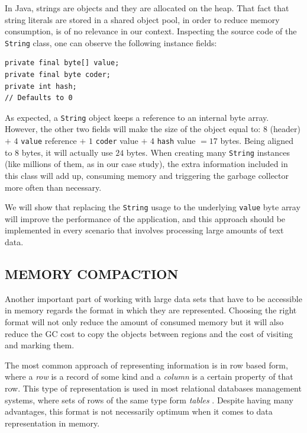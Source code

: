 \documentclass[a4paper,twoside]{article}
\begin{document}
In Java, strings are objects and they are allocated on the heap.
That fact that string literals are stored in a shared object pool, in order to reduce memory consumption, is of no relevance in our context.
Inspecting the source code of the \texttt{String} class, one can observe the following instance fields:
\begin{small}
\begin{verbatim}
private final byte[] value;
private final byte coder;
private int hash;
// Defaults to 0
\end{verbatim}
\end{small}

As expected, a \texttt{String} object keeps a reference to an internal byte array.
However, the other two fields will make the size of the object equal to: $8$ (header) $+$ $4$ \texttt{value} reference $+$ $1$  \texttt{coder} value $+$ $4$ \texttt{hash} value $= 17$ bytes.
Being aligned to $8$ bytes, it will actually use $24$ bytes.
When creating many \texttt{String} instances (like millions of them, as in our case study), the extra information included in this class will add up, consuming memory and  triggering the garbage collector more often than necessary. 

We will show that replacing the \texttt{String} usage to the underlying \texttt{value} byte array will improve the performance of the application, and this approach should be implemented in every scenario that involves processing large amounts of text data.



\subsection{\uppercase{Memory Compaction}}\label{subsec:uppercase}
Another important part of working with large data sets that have to be accessible in memory regards the format in which they are represented.
Choosing the right format will not only reduce the amount of consumed memory but it will also reduce the GC cost to copy the objects between regions and the cost of visiting and marking them.

The most common approach of representing information is in row based form, where a {\textit{row} } is a record of some kind and a {\textit{column} } is a certain property of that row.
This type of representation is used in most relational databases management systems, where sets of rows of the same type form {\textit{tables} }.
Despite having many advantages, this format is not necessarily optimum when it comes to data representation in memory.
\end{document}
